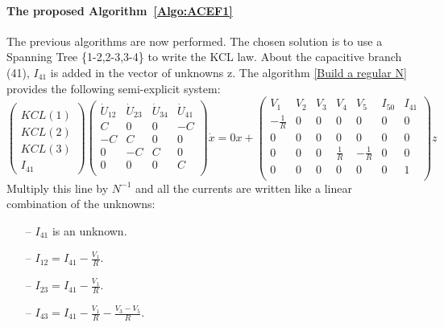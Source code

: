 \paragraph{The proposed Algorithm~\ref{Algo:ACEF1}}
The previous algorithms are now performed. The chosen solution is to use a Spanning Tree \{1-2,2-3,3-4\} to write the KCL law. About the capacitive branch (41), $I_{41}$ is
added in the vector of unknowns z.
The algorithm \ref{Build a regular N} provides the following semi-explicit system: 
\[\left(\begin{array}{c}
  \\
KCL(1)\\KCL(2)\\KCL(3)\\I_{41}
\end{array}\right)
\left(\begin{array}{cccc}
  \dot U_{12}&\dot U_{23}&\dot U_{34}&\dot U_{41}\\
  \hline
  C&0&0&-C\\
  -C&C&0&0\\
  0&-C&C&0\\
  0&0&0&C\\  
\end{array}\right) \dot x=0x+
\left(\begin{array}{ccccccc}
  V_{1}&V_{2}&V_{3}&V_{4}&V_{5}&I_{50}&I_{41}\\
  \hline
  -\frac{1}{R}&0&0&0&0&0&0\\
  0&0&0&0&0&0&0\\
  0&0&0&\frac{1}{R}&-\frac{1}{R}&0&0\\
  0&0&0&0&0&0&1\\
\end{array}\right)z
\]
Multiply this line by $N^{-1}$ and all the currents are written like a linear combination of the
unknowns:
\begin{enumerate}
\item [--] $I_{41}$ is an unknown.
\item [--] $I_{12}=I_{41}-\frac{V_1}{R}$.
\item [--] $I_{23}=I_{41}-\frac{V_1}{R}$.
\item [--] $I_{43}=I_{41}-\frac{V_1}{R} - \frac{V_3-V_5}{R}$.
\end{enumerate}

